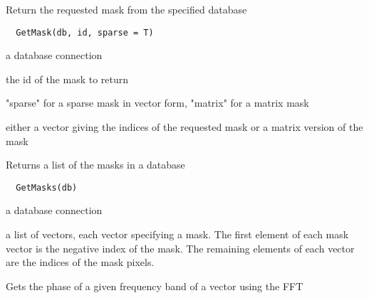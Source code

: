 \documentclass[a4paper]{book}
\begin{document}
%
\begin{Description}\relax
Return the requested mask from the specified database
\end{Description}
%
\begin{Usage}
\begin{verbatim}
  GetMask(db, id, sparse = T)
\end{verbatim}
\end{Usage}
%
\begin{Arguments}
\begin{ldescription}
\item[\code{db}] a database connection

\item[\code{id}] the id of the mask to return

\item[\code{format}] "sparse" for a sparse mask in vector form,
"matrix" for a matrix mask
\end{ldescription}
\end{Arguments}
%
\begin{Value}
either a vector giving the indices of the requested mask
or a matrix version of the mask
\end{Value}
%
\begin{Description}\relax
Returns a list of the masks in a database
\end{Description}
%
\begin{Usage}
\begin{verbatim}
  GetMasks(db)
\end{verbatim}
\end{Usage}
%
\begin{Arguments}
\begin{ldescription}
\item[\code{db}] a database connection
\end{ldescription}
\end{Arguments}
%
\begin{Value}
a list of vectors, each vector specifying a mask.  The
first element of each mask vector is the negative index
of the mask.  The remaining elements of each vector are
the indices of the mask pixels.
\end{Value}
%
\begin{Description}\relax
Gets the phase of a given frequency band of a vector
using the FFT
\end{Description}
\end{document}
